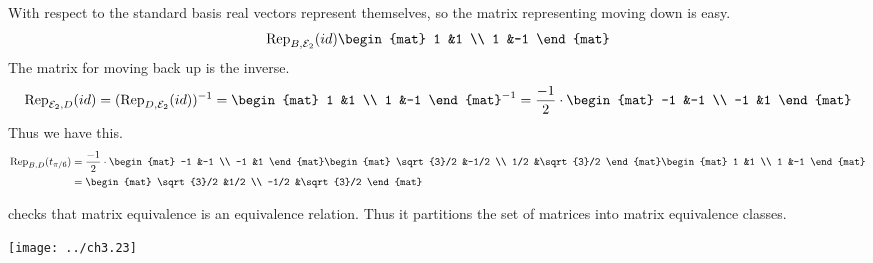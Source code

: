 \documentclass[10pt,t]{beamer}
\begin{document}
\begin{frame}
With respect to the standard basis real vectors represent themselves,
so the matrix representing moving down is easy.
\begin{equation*}
  \rep{id}{B,\stdbasis_2}
  \begin{mat}
    1 &1 \\
    1 &-1
  \end{mat}
\end{equation*}
The matrix for moving back up is the inverse.
\begin{equation*}
  \rep{id}{\stdbasis_2,D}
  =(\rep{id}{D,\stdbasis_2})^{-1}
  =
  \begin{mat}
    1 &1 \\
    1 &-1
  \end{mat}^{-1}
  =\frac{-1}{2}\cdot
  \begin{mat}
    -1 &-1 \\
   -1  &1
  \end{mat}
\end{equation*}
Thus we have this.
\begin{align*}
  \rep{t_{\pi/6}}{B,D}
  &=\frac{-1}{2}\cdot
  \begin{mat}
    -1 &-1 \\
   -1  &1
  \end{mat}
  \begin{mat}
    \sqrt{3}/2  &-1/2 \\
    1/2         &\sqrt{3}/2
  \end{mat}
  \begin{mat}
    1 &1 \\
    1 &-1
  \end{mat}                         \\
  &=
  \begin{mat}
    \sqrt{3}/2 &1/2 \\
    -1/2       &\sqrt{3}/2   
  \end{mat}
\end{align*}
\end{frame}




\begin{frame}
\pause
\co[le:MatEqIsSameMap]

\pause
\medskip
{} checks that
matrix equivalence is an equivalence relation.
Thus it  partitions 
the set of matrices into matrix equivalence classes.
\begin{center}
  \texttt{[image: ../ch3.23]}
\end{center}
\end{frame}
\end{document}
